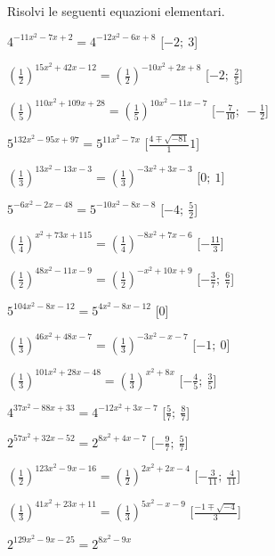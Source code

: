 \begin{esercizio}\label{ese:}
 Risolvi le seguenti equazioni elementari.
 \begin{enumeratea}
  \item  \(4^{-11 x^2 -7 x +2} = 4^{-12 x^2 -6 x +8}\)
   \hfill [\(-2;~3\)]
  \item  \(\left(\frac{1}{2}\right)^{15 x^2 +42 x -12} = 
\left(\frac{1}{2}\right)^{-10 x^2 +2 x +8}\)
   \hfill [\(-2;~\frac{2}{5}\)]
  \item  \(\left(\frac{1}{5}\right)^{110 x^2 +109 x +28} = 
\left(\frac{1}{5}\right)^{10 x^2 -11 x -7}\)
   \hfill [\(-\frac{7}{10};~-\frac{1}{2}\)]
  \item  \(5^{132 x^2 -95 x +97} = 5^{11 x^2 -7 x }\)
   \hfill [\(\frac{4 \mp \sqrt{-81}} 11\)]
  \item  \(\left(\frac{1}{3}\right)^{13 x^2 -13 x -3} = 
\left(\frac{1}{3}\right)^{-3 x^2 +3 x -3}\)
   \hfill [\(0;~1\)]
  \item  \(5^{-6 x^2 -2 x -48} = 5^{-10 x^2 -8 x -8}\)
   \hfill [\(-4;~\frac{5}{2}\)]
  \item  \(\left(\frac{1}{4}\right)^{x^2 +73 x +115} = 
\left(\frac{1}{4}\right)^{-8 x^2 +7 x -6}\)
   \hfill [\(-\frac{11}{3}\)]
  \item  \(\left(\frac{1}{2}\right)^{48 x^2 -11 x -9} = 
\left(\frac{1}{2}\right)^{- x^2 +10 x +9}\)
   \hfill [\(-\frac{3}{7};~\frac{6}{7}\)]
  \item  \(5^{104 x^2 -8 x -12} = 5^{4 x^2 -8 x -12}\)
   \hfill [\(0\)]
  \item  \(\left(\frac{1}{3}\right)^{46 x^2 +48 x -7} = 
\left(\frac{1}{3}\right)^{-3 x^2 - x -7}\)
   \hfill [\(-1;~0\)]
  \item  \(\left(\frac{1}{3}\right)^{101 x^2 +28 x -48} = 
\left(\frac{1}{3}\right)^{x^2 +8 x }\)
   \hfill [\(-\frac{4}{5};~\frac{3}{5}\)]
  \item  \(4^{37 x^2 -88 x +33} = 4^{-12 x^2 +3 x -7}\)
   \hfill [\(\frac{5}{7};~\frac{8}{7}\)]
  \item  \(2^{57 x^2 +32 x -52} = 2^{8 x^2 +4 x -7}\)
   \hfill [\(-\frac{9}{7};~\frac{5}{7}\)]
  \item  \(\left(\frac{1}{2}\right)^{123 x^2 -9 x -16} = 
\left(\frac{1}{2}\right)^{2 x^2 +2 x -4}\)
   \hfill [\(-\frac{3}{11};~\frac{4}{11}\)]
  \item  \(\left(\frac{1}{3}\right)^{41 x^2 +23 x +11} = 
\left(\frac{1}{3}\right)^{5 x^2 - x -9}\)
   \hfill [\(\frac{-1 \mp \sqrt{-4}} 3\)]
  \item  \(2^{129 x^2 -9 x -25} = 2^{8 x^2 -9 x }\)

\end{enumeratea}
\end{esercizio}

